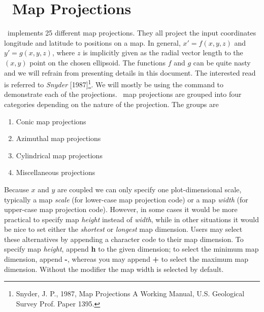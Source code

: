 %
%
\chapter{\gmt\ Map Projections}

\GMT\ implements 25 different map projections.  They all project the input coordinates
longitude and latitude to positions on a map.  In general, $x' = f(x,y,z)$ and $y' = g(x,y,z)$, where
$z$ is implicitly given as the radial vector length to the $(x,y)$ point on the chosen ellipsoid.  The functions $f$ and $g$ can be
quite nasty and we will refrain from presenting details in this document.  The interested read is referred to
{\it Snyder} [1987]\footnote{Snyder, J. P., 1987, Map Projections \- A Working Manual, U.S. Geological Survey Prof. Paper 1395.}.
We will mostly be using the  command to demonstrate each of the projections.
\GMT\ map projections are grouped into four categories depending on the
nature of the projection.  The groups are

\begin{enumerate}
\item Conic map projections
\item Azimuthal map projections
\item Cylindrical map projections
\item Miscellaneous projections
\end{enumerate}

Because $x$ and $y$ are coupled we can only specify one plot-dimensional scale, typically
a map \emph{scale} (for lower-case map projection code) or a map \emph{width} (for upper-case
map projection code).  However, in some cases it would be more
practical to specify map \emph{height} instead of \emph{width}, while in other situations it would be nice
to set either the \emph{shortest} or \emph{longest} map dimension.  Users may select
these alternatives by appending a character code to their map dimension.  To specify map \emph{height},
append {\bf h} to the given dimension; to select the minimum map dimension, append {\bf -}, whereas you may
append {\bf +} to select the maximum map dimension.  Without the modifier the map width is
selected by default.





